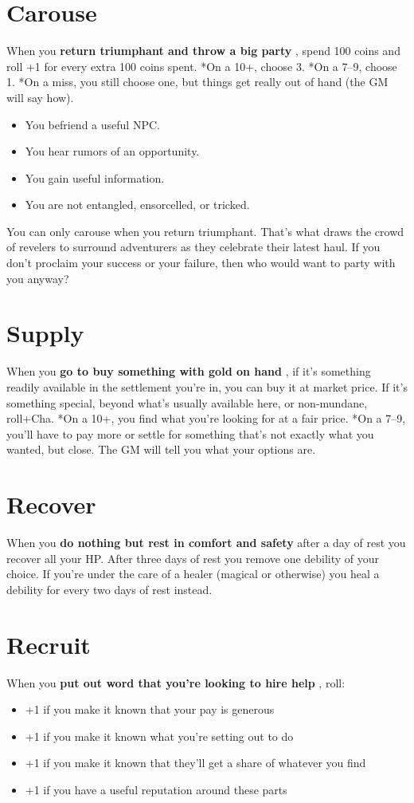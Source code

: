 \section*{Carouse}
\HRule
When you \textbf{return triumphant and throw a big party}
, spend 100 coins and roll +1 for every extra 100 coins spent. *On a 10+, choose 3. *On a 7--9, choose 1. *On a miss, you still choose one, but things get really out of hand (the GM will say how).
\begin{itemize}
\item You befriend a useful NPC.
\item You hear rumors of an opportunity.
\item You gain useful information.
\item You are not entangled, ensorcelled, or tricked.
\end{itemize}
\HRule

You can only carouse when you return triumphant. That's what draws the crowd of revelers to surround adventurers as they celebrate their latest haul. If you don't proclaim your success or your failure, then who would want to party with you anyway?
\section*{Supply}
\HRule
When you \textbf{go to buy something with gold on hand}
, if it's something readily available in the settlement you're in, you can buy it at market price. If it's something special, beyond what's usually available here, or non-mundane, roll+Cha. *On a 10+, you find what you're looking for at a fair price. *On a 7--9, you'll have to pay more or settle for something that's not exactly what you wanted, but close. The GM will tell you what your options are.
\HRule
\section*{Recover}
\HRule
When you \textbf{do nothing but rest in comfort and safety}
after a day of rest you recover all your HP\@. After three days of rest you remove one debility of your choice. If you're under the care of a healer (magical or otherwise) you heal a debility for every two days of rest instead.
\HRule
\section*{Recruit}
\HRule
When you \textbf{put out word that you're looking to hire help}
, roll: 
\begin{itemize}
\item +1 if you make it known that your pay is generous
\item +1 if you make it known what you're setting out to do
\item +1 if you make it known that they'll get a share of whatever you find
\item +1 if you have a useful reputation around these parts
\end{itemize}
\HRule

